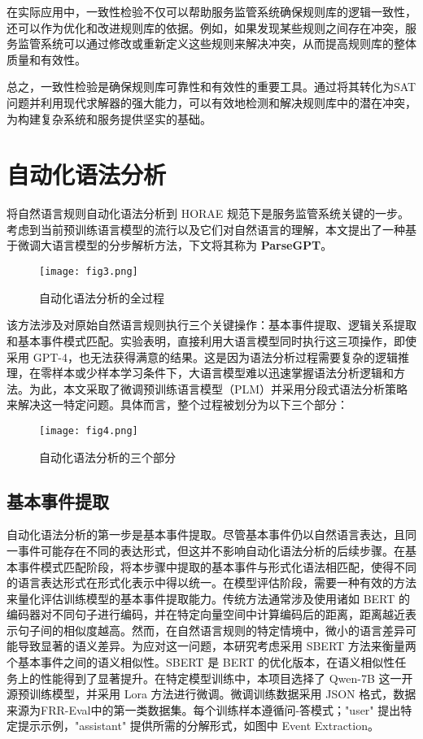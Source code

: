 在实际应用中，一致性检验不仅可以帮助服务监管系统确保规则库的逻辑一致性，还可以作为优化和改进规则库的依据。例如，如果发现某些规则之间存在冲突，服务监管系统可以通过修改或重新定义这些规则来解决冲突，从而提高规则库的整体质量和有效性。

总之，一致性检验是确保规则库可靠性和有效性的重要工具。通过将其转化为SAT问题并利用现代求解器的强大能力，可以有效地检测和解决规则库中的潜在冲突，为构建复杂系统和服务提供坚实的基础。

\newpage

\section{自动化语法分析}\label{自动化语法分析}

将自然语言规则自动化语法分析到 HORAE 规范下是服务监管系统关键的一步。考虑到当前预训练语言模型的流行以及它们对自然语言的理解，本文提出了一种基于微调大语言模型的分步解析方法，下文将其称为 \textbf{ParseGPT}。

\begin{figure*}[ht]
\centering
\texttt{[image: fig3.png]}
\caption{自动化语法分析的全过程}
\end{figure*}
该方法涉及对原始自然语言规则执行三个关键操作：基本事件提取、逻辑关系提取和基本事件模式匹配。实验表明，直接利用大语言模型同时执行这三项操作，即使采用 GPT-4，也无法获得满意的结果。这是因为语法分析过程需要复杂的逻辑推理，在零样本或少样本学习条件下，大语言模型难以迅速掌握语法分析逻辑和方法。为此，本文采取了微调预训练语言模型（PLM）并采用分段式语法分析策略来解决这一特定问题。具体而言，整个过程被划分为以下三个部分：
\begin{figure*}[ht]
    \centering
    \texttt{[image: fig4.png]}
    \caption{自动化语法分析的三个部分}
    \end{figure*}
\subsection{基本事件提取}
自动化语法分析的第一步是基本事件提取。尽管基本事件仍以自然语言表达，且同一事件可能存在不同的表达形式，但这并不影响自动化语法分析的后续步骤。在基本事件模式匹配阶段，将本步骤中提取的基本事件与形式化语法相匹配，使得不同的语言表达形式在形式化表示中得以统一。在模型评估阶段，需要一种有效的方法来量化评估训练模型的基本事件提取能力。传统方法通常涉及使用诸如 BERT 的编码器对不同句子进行编码，并在特定向量空间中计算编码后的距离，距离越近表示句子间的相似度越高。然而，在自然语言规则的特定情境中，微小的语言差异可能导致显著的语义差异。为应对这一问题，本研究考虑采用 SBERT 方法来衡量两个基本事件之间的语义相似性。SBERT 是 BERT 的优化版本，在语义相似性任务上的性能得到了显著提升。在特定模型训练中，本项目选择了 Qwen-7B 这一开源预训练模型，并采用 Lora 方法进行微调。微调训练数据采用 JSON 格式，数据来源为FRR-Eval中的第一类数据集。每个训练样本遵循问-答模式；"user" 提出特定提示示例，"assistant" 提供所需的分解形式，如图中 Event Extraction。

